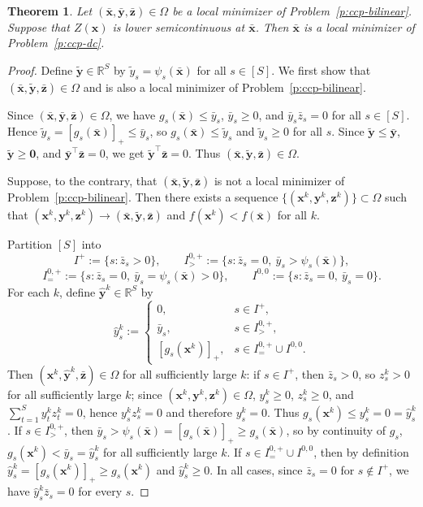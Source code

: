 \documentclass[10pt,a4paper]{amsart}
\newtheorem{theorem}{Theorem}
\def\Re{\mathbb{R}}
\def\bs{\boldsymbol}
\begin{document}
\begin{theorem}
Let $(\bar{\bs{x}},\bar{\bs{y}},\bar{\bs{z}})\in\Omega$ be a local minimizer of Problem~\eqref{p:ccp-bilinear}. Suppose that $Z(\bs{x})$ is lower semicontinuous at $\bar{\bs{x}}$. Then $\bar{\bs{x}}$ is a local minimizer of Problem~\eqref{p:ccp-dc}.
\end{theorem}

\begin{proof}
Define $\tilde{\bs{y}}\in\Re^S$ by $\tilde{y}_s=\psi_s(\bar{\bs{x}})$ for all $s\in[S]$.
We first show that $(\bar{\bs{x}},\tilde{\bs{y}},\bar{\bs{z}})\in\Omega$ and is also a local minimizer of Problem~\eqref{p:ccp-bilinear}.

Since $(\bar{\bs{x}},\bar{\bs{y}},\bar{\bs{z}})\in\Omega$, we have
$g_s(\bar{\bs{x}})\le \bar{y}_s$, $\bar{y}_s\ge 0$, and $\bar{y}_s\bar{z}_s=0$ for all $s\in[S]$.
Hence $\tilde{y}_s=[g_s(\bar{\bs{x}})]_+\le \bar{y}_s$, so $g_s(\bar{\bs{x}})\le \tilde{y}_s$ and
$\tilde{y}_s\ge 0$ for all $s$. Since $\tilde{\bs{y}}\le \bar{\bs{y}}$, $\tilde{\bs{y}}\ge \bs{0}$, and
$\bar{\bs{y}}^\top\bar{\bs{z}}=0$, we get $\tilde{\bs{y}}^\top\bar{\bs{z}}=0$. Thus
$(\bar{\bs{x}},\tilde{\bs{y}},\bar{\bs{z}})\in\Omega$.

Suppose, to the contrary, that $(\bar{\bs{x}},\tilde{\bs{y}},\bar{\bs{z}})$ is not a local minimizer of
Problem~\eqref{p:ccp-bilinear}. Then there exists a sequence
$\{(\bs{x}^k,\bs{y}^k,\bs{z}^k)\}\subset\Omega$ such that
$(\bs{x}^k,\bs{y}^k,\bs{z}^k)\to(\bar{\bs{x}},\tilde{\bs{y}},\bar{\bs{z}})$ and
$f(\bs{x}^k)<f(\bar{\bs{x}})$ for all $k$.

Partition $[S]$ into
\[
I^+:=\{s:\bar{z}_s>0\},\qquad
I^{0,+}_{>} := \{s:\bar{z}_s=0,\ \bar{y}_s>\psi_s(\bar{\bs{x}})\},
\]
\[
I^{0,+}_{=} := \{s:\bar{z}_s=0,\ \bar{y}_s=\psi_s(\bar{\bs{x}})>0\},\qquad
I^{0,0}:=\{s:\bar{z}_s=0,\ \bar{y}_s=0\}.
\]
For each $k$, define $\hat{\bs{y}}^k\in\Re^S$ by
\[
\hat{y}_s^k:=
\begin{cases}
0, & s\in I^+,\\[1mm]
\bar{y}_s, & s\in I^{0,+}_{>},\\[1mm]
[g_s(\bs{x}^k)]_+, & s\in I^{0,+}_{=}\cup I^{0,0}.
\end{cases}
\]
Then $(\bs{x}^k,\hat{\bs{y}}^k,\bar{\bs{z}})\in\Omega$ for all sufficiently large $k$:
if $s\in I^+$, then $\bar z_s>0$, so $z_s^k>0$ for all sufficiently large $k$; since
$(\bs{x}^k,\bs{y}^k,\bs{z}^k)\in\Omega$, $y_s^k\ge 0$, $z_s^k\ge 0$, and
$\sum_{t=1}^S y_t^k z_t^k=0$, hence $y_s^k z_s^k=0$ and therefore $y_s^k=0$.
Thus $g_s(\bs{x}^k)\le y_s^k=0=\hat y_s^k$.
If $s\in I^{0,+}_{>}$, then $\bar y_s>\psi_s(\bar{\bs{x}})=[g_s(\bar{\bs{x}})]_+\ge g_s(\bar{\bs{x}})$,
so by continuity of $g_s$, $g_s(\bs{x}^k)<\bar y_s=\hat y_s^k$ for all sufficiently large $k$.
If $s\in I^{0,+}_{=}\cup I^{0,0}$, then by definition
$\hat y_s^k=[g_s(\bs{x}^k)]_+\ge g_s(\bs{x}^k)$ and $\hat y_s^k\ge 0$.
In all cases, since $\bar z_s=0$ for $s\notin I^+$, we have $\hat y_s^k\bar z_s=0$ for every $s$.


\end{proof}
\end{document}
